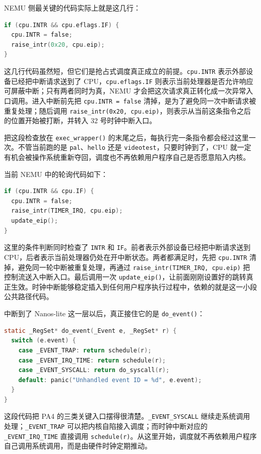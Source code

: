 \documentclass[a4paper]{article}
\begin{document}
NEMU 侧最关键的代码实际上就是这几行：
\begin{lstlisting}[language=C]
if (cpu.INTR && cpu.eflags.IF) {
  cpu.INTR = false;
  raise_intr(0x20, cpu.eip);
}
\end{lstlisting}

这几行代码虽然短，但它们是抢占式调度真正成立的前提。\texttt{cpu.INTR} 表示外部设备已经把中断请求送到了 CPU，\texttt{cpu.eflags.IF} 则表示当前处理器是否允许响应可屏蔽中断；只有两者同时为真，NEMU 才会把这次请求真正转化成一次异常入口调用。进入中断前先把 \texttt{cpu.INTR = false} 清掉，是为了避免同一次中断请求被重复处理；随后调用 \texttt{raise\_intr(0x20, cpu.eip)}，则表示从当前这条指令之后的位置开始被打断，并转入 32 号时钟中断入口。

把这段检查放在 \texttt{exec\_wrapper()} 的末尾之后，每执行完一条指令都会经过这里一次。不管当前跑的是 \texttt{pal}、\texttt{hello} 还是 \texttt{videotest}，只要时钟到了，CPU 就一定有机会被操作系统重新夺回，调度也不再依赖用户程序自己是否愿意陷入内核。

当前 NEMU 中的轮询代码如下：
\begin{lstlisting}[language=C]
if (cpu.INTR && cpu.IF) {
  cpu.INTR = false;
  raise_intr(TIMER_IRQ, cpu.eip);
  update_eip();
}
\end{lstlisting}

这里的条件判断同时检查了 \texttt{INTR} 和 \texttt{IF}。前者表示外部设备已经把中断请求送到 CPU，后者表示当前处理器仍处在开中断状态。两者都满足时，先把 \texttt{cpu.INTR} 清掉，避免同一轮中断被重复处理，再通过 \texttt{raise\_intr(TIMER\_IRQ, cpu.eip)} 把控制流送入中断入口。最后调用一次 \texttt{update\_eip()}，让前面刚刚设置好的跳转真正生效。时钟中断能够稳定插入到任何用户程序执行过程中，依赖的就是这一小段公共路径代码。

中断到了 Nanos-lite 这一层以后，真正接住它的是 \texttt{do\_event()}：
\begin{lstlisting}[language=C]
static _RegSet* do_event(_Event e, _RegSet* r) {
  switch (e.event) {
    case _EVENT_TRAP: return schedule(r);
    case _EVENT_IRQ_TIME: return schedule(r);
    case _EVENT_SYSCALL: return do_syscall(r);
    default: panic("Unhandled event ID = %d", e.event);
  }
}
\end{lstlisting}

这段代码把 PA4 的三类关键入口摆得很清楚。\texttt{\_EVENT\_SYSCALL} 继续走系统调用处理；\texttt{\_EVENT\_TRAP} 可以把内核自陷接入调度；而时钟中断对应的 \texttt{\_EVENT\_IRQ\_TIME} 直接调用 \texttt{schedule(r)}。从这里开始，调度就不再依赖用户程序自己调用系统调用，而是由硬件时钟定期推动。
\end{document}
